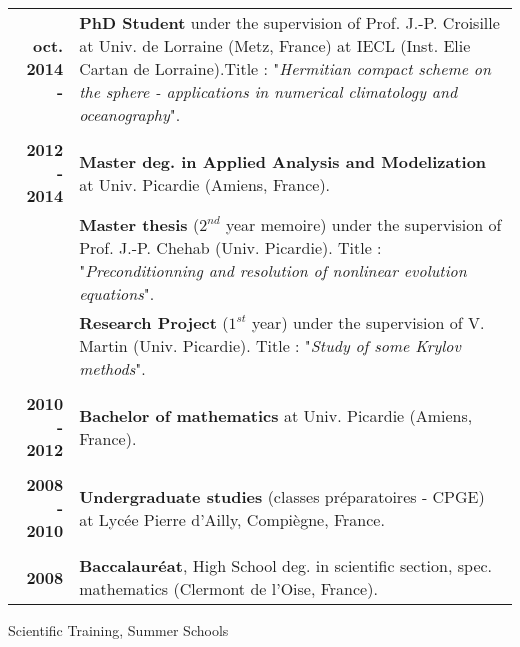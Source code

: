 \documentclass[10pt,a4paper]{report}
\begin{document}
\begin{center}
\begin{tabular}{r p{12cm}}
\textbf{oct. 2014 - } & \textbf{PhD Student} under the supervision of Prof. J.-P. Croisille at Univ. de Lorraine (Metz, France) at IECL (Inst. Elie Cartan de Lorraine).\newline Title : "\textit{Hermitian compact scheme on the sphere - applications in numerical climatology and oceanography}".\\

& \\

\textbf{2012 - 2014} & \textbf{Master deg. in Applied Analysis and Modelization} at Univ. Picardie (Amiens, France). \\

& \textbf{Master thesis} ($2^{nd}$ year memoire) under the supervision of Prof. J.-P. Chehab (Univ. Picardie). \newline 
Title : "\textit{Preconditionning and resolution of nonlinear evolution equations}". \\

& \textbf{Research Project} ($1^{st}$ year) under the supervision of V. Martin (Univ. Picardie). \newline 
Title : "\textit{Study of some Krylov methods}". \\

& \\

\textbf{2010 - 2012} & \textbf{Bachelor of mathematics} at Univ. Picardie (Amiens, France). \\

& \\

\textbf{2008 - 2010} & \textbf{Undergraduate studies} (classes préparatoires - CPGE) at Lycée Pierre d'Ailly, Compiègne, France.\\

& \\

\textbf{2008} & \textbf{Baccalauréat}, High School deg. in scientific section, spec. mathematics (Clermont de l'Oise, France).\\
\end{tabular}
\end{center}

\vspace{.5cm}
\noindent
{\selectfont
\begin{Large}
Scientific Training, Summer Schools
\end{Large}
\hrulefill
}
\end{document}
